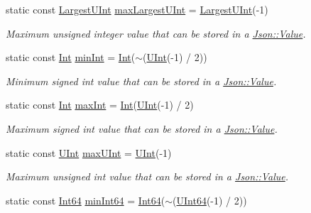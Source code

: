 \begin{DoxyCompactItemize}
static const \hyperlink{class_json_1_1_value_a6682a3684d635e03fc06ba229fa24eec}{Largest\+U\+Int} \hyperlink{class_json_1_1_value_a2337d4fee6277c9f9b8feb21e6cd9f1c}{max\+Largest\+U\+Int} = \hyperlink{class_json_1_1_value_a6682a3684d635e03fc06ba229fa24eec}{Largest\+U\+Int}(-\/1)
\begin{DoxyCompactList}\small\item\em Maximum unsigned integer value that can be stored in a \hyperlink{class_json_1_1_value}{Json\+::\+Value}. \end{DoxyCompactList}\item 
static const \hyperlink{class_json_1_1_value_abdf7a7ff73eb130ffcab28504ffdb405}{Int} \hyperlink{class_json_1_1_value_ad062d227e00408ce594026959d6ed2e1}{min\+Int} = \hyperlink{class_json_1_1_value_abdf7a7ff73eb130ffcab28504ffdb405}{Int}($\sim$(\hyperlink{class_json_1_1_value_a0933d59b45793ae4aade1757c322a98d}{U\+Int}(-\/1) / 2))
\begin{DoxyCompactList}\small\item\em Minimum signed int value that can be stored in a \hyperlink{class_json_1_1_value}{Json\+::\+Value}. \end{DoxyCompactList}\item 
static const \hyperlink{class_json_1_1_value_abdf7a7ff73eb130ffcab28504ffdb405}{Int} \hyperlink{class_json_1_1_value_af13109d78a22923e397dc2b60a74714c}{max\+Int} = \hyperlink{class_json_1_1_value_abdf7a7ff73eb130ffcab28504ffdb405}{Int}(\hyperlink{class_json_1_1_value_a0933d59b45793ae4aade1757c322a98d}{U\+Int}(-\/1) / 2)
\begin{DoxyCompactList}\small\item\em Maximum signed int value that can be stored in a \hyperlink{class_json_1_1_value}{Json\+::\+Value}. \end{DoxyCompactList}\item 
static const \hyperlink{class_json_1_1_value_a0933d59b45793ae4aade1757c322a98d}{U\+Int} \hyperlink{class_json_1_1_value_a905f07575ee561e5b0f0a57e8ea31462}{max\+U\+Int} = \hyperlink{class_json_1_1_value_a0933d59b45793ae4aade1757c322a98d}{U\+Int}(-\/1)
\begin{DoxyCompactList}\small\item\em Maximum unsigned int value that can be stored in a \hyperlink{class_json_1_1_value}{Json\+::\+Value}. \end{DoxyCompactList}\item 
static const \hyperlink{class_json_1_1_value_a1b86af9f85f0f1baa972c3319fa22695}{Int64} \hyperlink{class_json_1_1_value_a4188810a086c06bbafc12968b36c999f}{min\+Int64} = \hyperlink{class_json_1_1_value_a1b86af9f85f0f1baa972c3319fa22695}{Int64}($\sim$(\hyperlink{class_json_1_1_value_a8b62564be8c087c6d18de180ff4e13e3}{U\+Int64}(-\/1) / 2))

\end{DoxyCompactItemize}
